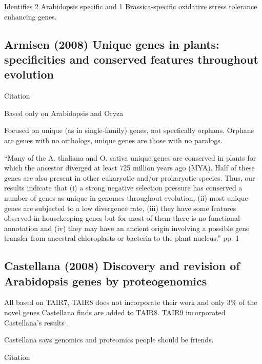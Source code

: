 Identifies 2 Arabidopsis specific and 1 Brassica-specific oxidative stress
tolerance enhancing genes.

\subsection{Armisen (2008) Unique genes in plants: specificities and
conserved features throughout evolution}

    Citation \cite{armisen_unique_2008}

    Based only on Arabidopsis and Oryza

    Focused on unique (as in single-family) genes, not specfically orphans.
    Orphans are genes with no orthologs, unique genes are those with no
    paralogs.

    ``Many of the A. thaliana and O. sativa unique genes are conserved in
    plants for which the ancestor diverged at least 725 million years ago
    (MYA). Half of these genes are also present in other eukaryotic and/or
    prokaryotic species. Thus, our results indicate that (i) a strong
    negative selection pressure has conserved a number of genes as unique
    in genomes throughout evolution, (ii) most unique genes are subjected
    to a low divergence rate, (iii) they have some features observed in
    housekeeping genes but for most of them there is no functional
    annotation and (iv) they may have an ancient origin involving a
    possible gene transfer from ancestral chloroplasts or bacteria to the
    plant nucleus.'' pp. 1

\subsection{Castellana (2008) Discovery and revision of Arabidopsis genes by proteogenomics}

    All based on TAIR7, TAIR8 does not incorporate their work and only 3\% of
    the novel genes Castellana finds are added to TAIR8. TAIR9 incorporated
    Castellana's results \cite{lamesch_arabidopsis_2011}.

    Castellana says genomics and proteomics people should be friends.

    Citation \cite{castellana_discovery_2008}

